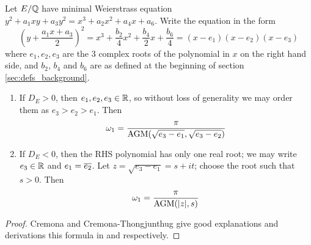 \begin{proposition}\label{prop:real_period_by_AGM}
Let $E/\mathbb{Q}$ have minimal Weierstrass equation $y^2 + a_1 xy + a_3 y^2 = x^3 + a_2 x^2 + a_4 x + a_6$. Write the equation in the form
\begin{equation}\label{eqn:weierstrass_with_bn}
\left(y + \frac{a_1x + a_3}{2}\right)^2 = x^3 + \frac{b_2}{4} x^2 + \frac{b_4}{2} x + \frac{b_6}{4} = (x-e_1)(x-e_2)(x-e_3)
\end{equation}
where $e_1,e_2,e_3$ are the 3 complex roots of the polynomial in $x$ on the right hand side, and $b_2$, $b_4$ and $b_6$ are as defined at the beginning of section \ref{sec:defs_background}.
\begin{enumerate}
\item If $D_E > 0$, then $e_1,e_2,e_3 \in \mathbb{R}$, so without loss of generality we may order them as $e_3 > e_2 > e_1$. Then
\begin{equation}\label{eqn:omega_D_pos}
\omega_1 = \frac{\pi}{\text{AGM}(\sqrt{e_3-e_1},\sqrt{e_3-e_2})}
\end{equation}
\item If $D_E < 0$, then the RHS polynomial has only one real root; we may write $e_3 \in \mathbb{R}$ and $e_1 = \overline{e_2}$. Let $z = \sqrt{e_3-e_1} = s + it$; choose the root such that $s>0$. Then
\begin{equation}\label{eqn:omega_D_neg}
\omega_1 = \frac{\pi}{\text{AGM}(|z|,s)}
\end{equation}
\end{enumerate}
\end{proposition}
\begin{proof}
Cremona and Cremona-Thongjunthug give good explanations and derivations this formula in \cite{Cre-1997} and \cite{Cre-2013} respectively.
\end{proof}

